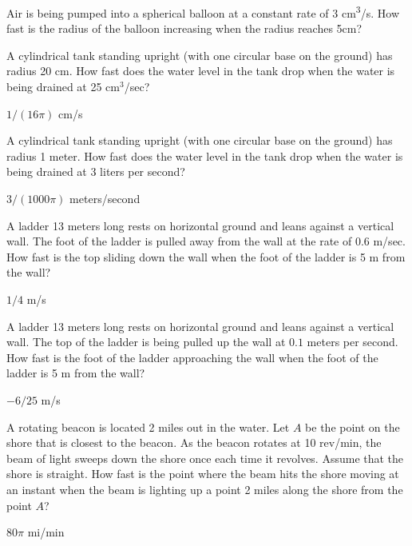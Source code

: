 \begin{enumialphparenastyle}

\begin{ex}
Air is being pumped into a spherical balloon at a constant rate of 3 cm\textsuperscript{3}/s. How fast is the radius of the balloon increasing when the radius reaches 5cm?
\end{ex}

\begin{ex} 
A cylindrical tank standing upright (with one circular base on the
ground) has radius 20 cm.  How fast does the water level in the
tank drop when the water is being drained at 25 cm${}^3$/sec?
\begin{sol}
	$1/(16\pi)$ cm/s
\end{sol}
\end{ex}

\begin{ex} 
A cylindrical tank standing upright (with one circular base on the
ground) has radius 1 meter.  How fast does the water level in the
tank drop when the water is being drained at 3 liters per second?
\begin{sol}
	$3/(1000\pi)$ meters/second
\end{sol}
\end{ex}

\begin{ex} 
A ladder 13 meters long rests on horizontal ground and leans
against a vertical wall.  The foot of the ladder is pulled away from
the wall at the rate of 0.6 m/sec.  How fast is the top sliding down
the wall when the foot of the ladder is 5 m from the wall?
\begin{sol}
	$1/4$ m/s
\end{sol}
\end{ex}

\begin{ex} 
A ladder 13 meters long rests on horizontal ground and leans
against a vertical wall. The top of the ladder is being pulled up the
wall at $0.1$ meters per second.
How fast is the foot of the ladder approaching 
the wall when the foot of the ladder is 5 m from the wall?
\begin{sol}
	$-6/25$ m/s
\end{sol}
\end{ex}

\begin{ex} 
A rotating beacon is located 2 miles out in the water.  Let $A$ be the
point on the shore that is closest to the beacon.  As the beacon rotates at
10 rev/min, the beam of light sweeps down the shore once each time it revolves.
Assume that the shore is straight.  How fast is the point where the beam
hits the shore moving at an instant when the beam is lighting up a point 2
miles along the shore from the point $A$?
\begin{sol}
	$80\pi$ mi/min
\end{sol}
\end{ex}


\end{enumialphparenastyle}
